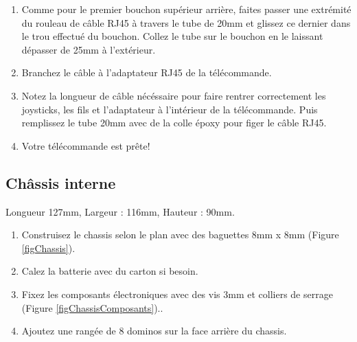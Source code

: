\documentclass[11pt,a4paper]{article}
\begin{document}
\begin{enumerate}
          \item Comme pour le premier bouchon supérieur arrière, faites passer une extrémité du rouleau de câble RJ45 à travers le tube de 20mm et glissez ce dernier dans le trou effectué du bouchon. Collez le tube sur le bouchon en le laissant dépasser de 25mm à l'extérieur. 
          
          \item Branchez le câble à l'adaptateur RJ45 de la télécommande.
          
          \item Notez la longueur de câble nécéssaire pour faire rentrer correctement les joysticks, les fils et l'adaptateur à l'intérieur de la télécommande. Puis remplissez le tube 20mm avec de la colle époxy pour figer le câble RJ45.
          
          \item Votre télécommande est prête!
        \end{enumerate}

      
      \subsection{Châssis interne}
        Longueur 127mm, Largeur : 116mm, Hauteur : 90mm.
        \begin{enumerate}
          \item Construisez le chassis selon le plan avec des baguettes 8mm x 8mm (Figure \ref{figChassis}).

          \item Calez la batterie avec du carton si besoin.
          
          \item Fixez les composants électroniques avec des vis 3mm et colliers de serrage (Figure \ref{figChassisComposants})..
          
          \item Ajoutez une rangée de 8 dominos sur la face arrière du chassis.
        \end{enumerate}
        
\end{document}
